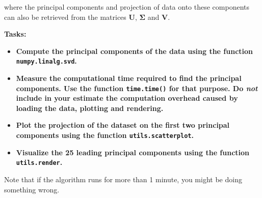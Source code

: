 \documentclass[11pt]{article}
\providecommand{\tightlist}{%
      \setlength{\itemsep}{0pt}\setlength{\parskip}{0pt}}
\begin{document}
where the principal components and projection of data onto these
components can also be retrieved from the matrices \(\boldsymbol{U}\),
\(\boldsymbol{\Sigma}\) and \(\boldsymbol{V}\).

\textbf{Tasks:}

\begin{itemize}
\tightlist
\item
  \textbf{Compute the principal components of the data using the
  function \texttt{numpy.linalg.svd}.}
\item
  \textbf{Measure the computational time required to find the principal
  components. Use the function \texttt{time.time()} for that purpose. Do
  \emph{not} include in your estimate the computation overhead caused by
  loading the data, plotting and rendering.}
\item
  \textbf{Plot the projection of the dataset on the first two principal
  components using the function \texttt{utils.scatterplot}.}
\item
  \textbf{Visualize the 25 leading principal components using the
  function \texttt{utils.render}.}
\end{itemize}

Note that if the algorithm runs for more than 1 minute, you might be
doing something wrong.
\end{document}
